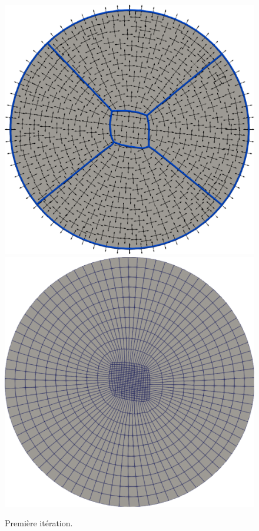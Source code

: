 \begin{figure}[h!]
\centering
\includegraphics[scale=0.27]{images/explosion_1.pdf}
\hfill
\includegraphics[scale=0.27]{images/explosion_2.pdf}
\caption{Première itération.}
\label{fig:iteration_1}
\end{figure}

